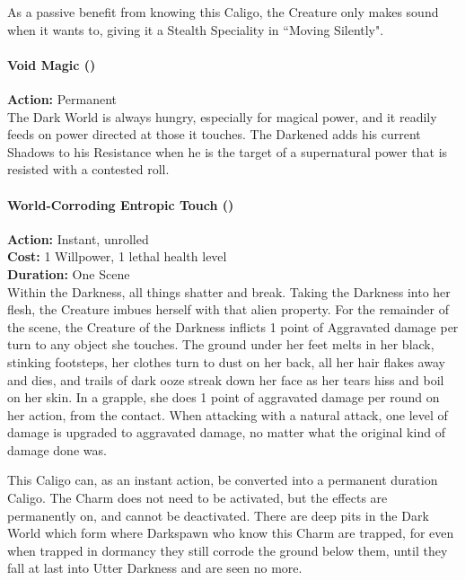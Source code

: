 As a passive benefit from knowing this Caligo, the Creature only makes sound when it wants to, giving it a Stealth Speciality in \textquotedblleft Moving Silently".

\paragraph*{Void Magic (\textbullet)} 

\noindent \textbf{Action:} Permanent \\

\noindent The Dark World is always hungry, especially for magical power, and it readily feeds on power directed at those it touches. The Darkened adds his current Shadows to his Resistance when he is the target of a supernatural power that is resisted with a contested roll.\\

\paragraph*{World-Corroding Entropic Touch (\textbullet\textbullet\textbullet)}

\noindent \textbf{Action:} Instant, unrolled\\

\noindent \textbf{Cost:} 1 Willpower, 1 lethal health level\\

\noindent \textbf{Duration:} One Scene\\

\noindent Within the Darkness, all things shatter and break. Taking the Darkness into her flesh, the Creature imbues herself with that alien property. For the remainder of the scene, the Creature of the Darkness inflicts 1 point of Aggravated damage per turn to any object she touches. The ground under her feet melts in her black, stinking footsteps, her clothes turn to dust on her back, all her hair flakes away and dies, and trails of dark ooze streak down her face as her tears hiss and boil on her skin. In a grapple, she does 1 point of aggravated damage per round on her action, from the contact. When attacking with a natural attack, one level of damage is upgraded to aggravated damage, no matter what the original kind of damage done was.

This Caligo can, as an instant action, be converted into a permanent duration Caligo. The Charm does not need to be activated, but the effects are permanently on, and cannot be deactivated. There are deep pits in the Dark World which form where Darkspawn who know this Charm are trapped, for even when trapped in dormancy they still corrode the ground below them, until they fall at last into Utter Darkness and are seen no more.\\

